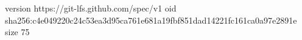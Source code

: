 version https://git-lfs.github.com/spec/v1
oid sha256:c4e049220c24c53ea3d95ca761e681a19fbf851dad14221fc161ca0a97e2891e
size 75
